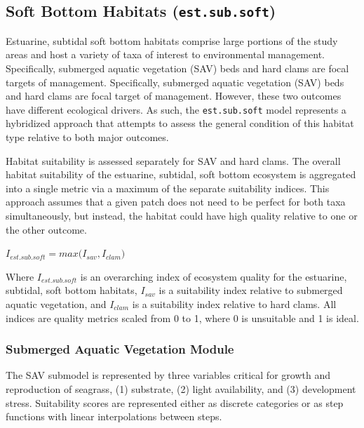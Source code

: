 \documentclass[
]{book}
\begin{document}
\hypertarget{soft-bottom-habitats-est.sub.soft}{%
\subsection{\texorpdfstring{Soft Bottom Habitats (\texttt{est.sub.soft})}{Soft Bottom Habitats (est.sub.soft)}}\label{soft-bottom-habitats-est.sub.soft}}

Estuarine, subtidal soft bottom habitats comprise large portions of the study areas and host a variety of taxa of interest to environmental management. Specifically, submerged aquatic vegetation (SAV) beds and hard clams are focal targets of management. Specifically, submerged aquatic vegetation (SAV) beds and hard clams are focal target of management. However, these two outcomes have different ecological drivers. As such, the \texttt{est.sub.soft} model represents a hybridized approach that attempts to assess the general condition of this habitat type relative to both major outcomes.

Habitat suitability is assessed separately for SAV and hard clams. The overall habitat suitability of the estuarine, subtidal, soft bottom ecosystem is aggregated into a single metric via a maximum of the separate suitability indices. This approach assumes that a given patch does not need to be perfect for both taxa simultaneously, but instead, the habitat could have high quality relative to one or the other outcome.

\(I_{est.sub.soft} = max({I_{sav},I_{clam})}\)

Where \(I_{est.sub.soft}\) is an overarching index of ecosystem quality for the estuarine, subtidal, soft bottom habitats, \(I_{sav}\) is a suitability index relative to submerged aquatic vegetation, and \(I_{clam}\) is a suitability index relative to hard clams. All indices are quality metrics scaled from 0 to 1, where 0 is unsuitable and 1 is ideal.

\hypertarget{submerged-aquatic-vegetation-module}{%
\subsubsection{Submerged Aquatic Vegetation Module}\label{submerged-aquatic-vegetation-module}}

The SAV submodel is represented by three variables critical for growth and reproduction of seagrass, (1) substrate, (2) light availability, and (3) development stress. Suitability scores are represented either as discrete categories or as step functions with linear interpolations between steps.
\end{document}
